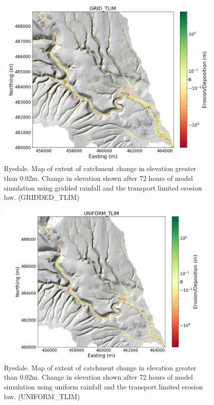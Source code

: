 \begin{figure}[htb]
\includegraphics[width=16cm]{chp06_figures_scripts/fig_ryedale_lower_erodediff_grid_tlim.png}
\caption{Ryedale. Map of extent of catchment change in elevation greater than 0.02m. Change in elevation shown after 72 hours of model simulation using gridded rainfall and the transport limited erosion law. (GRIDDED\_TLIM)}
\label{fig_ryedale_erodediff_lower_grid_tlim}
\end{figure}

\begin{figure}[htb]
\includegraphics[width=16cm]{chp06_figures_scripts/fig_ryedale_lower_erodediff_uniform_tlim.png}
\caption{Ryedale. Map of extent of catchment change in elevation greater than 0.02m. Change in elevation shown after 72 hours of model simulation using uniform rainfall and the transport limited erosion law. (UNIFORM\_TLIM)}
\label{fig_ryedale_erodediff_lower_uniform_tlim}
\end{figure}

